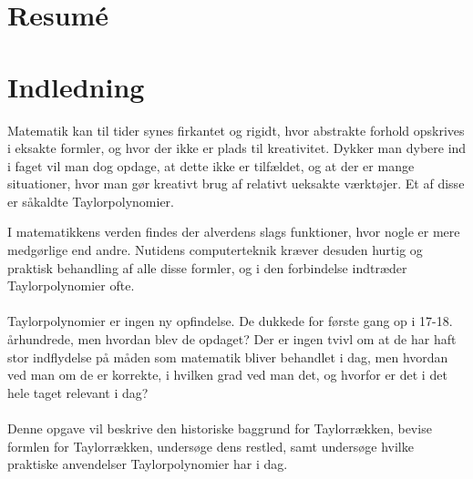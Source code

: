 \documentclass[12pt, a4paper]{article}
\begin{document}
\begin{refsection}
\section*{Resumé} %
\blindtext[1-2]
\tableofcontents
\newpage



\section{Indledning} %
Matematik kan til tider synes firkantet og rigidt, hvor abstrakte forhold opskrives i eksakte formler, og hvor der ikke er plads til kreativitet. 
Dykker man dybere ind i faget vil man dog opdage, at dette ikke er tilfældet, og at der er mange situationer, hvor man gør kreativt brug af relativt ueksakte værktøjer. Et af disse er såkaldte Taylorpolynomier.


I matematikkens verden findes der alverdens slags funktioner, hvor nogle er mere medgørlige end andre. Nutidens computerteknik kræver desuden hurtig og praktisk behandling af alle disse formler, og i den forbindelse indtræder Taylorpolynomier ofte.\\
\\
Taylorpolynomier er ingen ny opfindelse. De dukkede for første gang op i 17-18. århundrede, men hvordan blev de opdaget? Der er ingen tvivl om at de har haft stor indflydelse på måden som matematik bliver behandlet i dag, men hvordan ved man om de er korrekte, i hvilken grad ved man det, og hvorfor er det i det hele taget relevant i dag?\\
\\
Denne opgave vil beskrive den historiske baggrund for Taylorrækken, bevise formlen for Taylorrækken, undersøge dens restled, samt undersøge hvilke praktiske anvendelser Taylorpolynomier har i dag.


\end{refsection}
\end{document}
